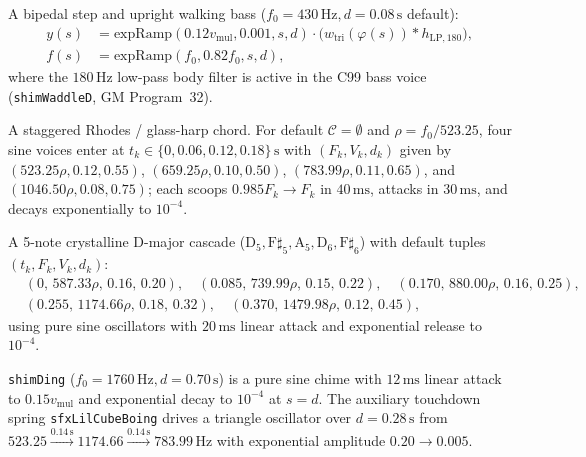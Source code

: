 \begin{definition}
A bipedal step and upright walking bass ($f_0 = 430\,\text{Hz}, d = 0.08\,\text{s}$ default):
\begin{align}
y(s) &= \mathrm{expRamp}(0.12 v_{\mathrm{mul}}, 0.001, s, d)\cdot\big(w_{\mathrm{tri}}(\varphi(s)) * h_{\mathrm{LP}, 180}\big), \\
f(s) &= \mathrm{expRamp}(f_0, 0.82 f_0, s, d),
\end{align}
where the $180\,\text{Hz}$ low-pass body filter is active in the C99 bass voice (\texttt{shimWaddleD}, GM Program~32).
\end{definition}

\begin{definition}
A staggered Rhodes / glass-harp chord. For default $\mathcal{C} = \emptyset$ and $\rho = f_0/523.25$, four sine voices enter at $t_k \in \{0, 0.06, 0.12, 0.18\}\,\text{s}$ with $(F_k, V_k, d_k)$ given by $(523.25\rho, 0.12, 0.55)$, $(659.25\rho, 0.10, 0.50)$, $(783.99\rho, 0.11, 0.65)$, and $(1046.50\rho, 0.08, 0.75)$; each scoops $0.985 F_k \to F_k$ in $40\,\text{ms}$, attacks in $30\,\text{ms}$, and decays exponentially to $10^{-4}$.
\end{definition}

\begin{definition}
A 5-note crystalline D-major cascade ($\mathrm{D}_5, \mathrm{F}\sharp_5, \mathrm{A}_5, \mathrm{D}_6, \mathrm{F}\sharp_6$) with default tuples $(t_k, F_k, V_k, d_k)$:
\begin{align*}
&(0,\, 587.33\rho,\, 0.16,\, 0.20), \quad (0.085,\, 739.99\rho,\, 0.15,\, 0.22), \quad (0.170,\, 880.00\rho,\, 0.16,\, 0.25), \\
&(0.255,\, 1174.66\rho,\, 0.18,\, 0.32), \quad (0.370,\, 1479.98\rho,\, 0.12,\, 0.45),
\end{align*}
using pure sine oscillators with $20\,\text{ms}$ linear attack and exponential release to $10^{-4}$.
\end{definition}

\begin{definition}
\texttt{shimDing} ($f_0 = 1760\,\text{Hz}, d = 0.70\,\text{s}$) is a pure sine chime with $12\,\text{ms}$ linear attack to $0.15 v_{\mathrm{mul}}$ and exponential decay to $10^{-4}$ at $s = d$. The auxiliary touchdown spring \texttt{sfxLilCubeBoing} drives a triangle oscillator over $d = 0.28\,\text{s}$ from $523.25 \xrightarrow{0.14\,\text{s}} 1174.66 \xrightarrow{0.14\,\text{s}} 783.99\,\text{Hz}$ with exponential amplitude $0.20 \to 0.005$.
\end{definition}

